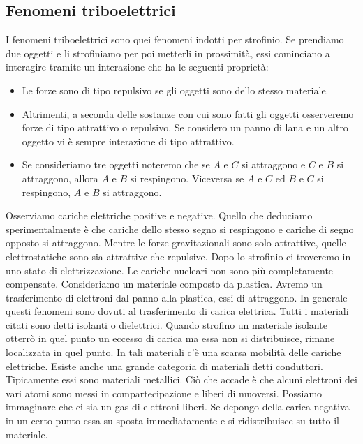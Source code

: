 \subsection{Fenomeni triboelettrici}

I fenomeni triboelettrici sono quei fenomeni indotti per strofinio. Se prendiamo due oggetti e li strofiniamo per poi metterli in prossimità, essi cominciano a interagire tramite un interazione che ha le seguenti proprietà:

\begin{itemize}
	\item Le forze sono di tipo repulsivo se gli oggetti sono dello stesso materiale.
	\item Altrimenti, a seconda delle sostanze con cui sono fatti gli oggetti osserveremo forze di tipo attrattivo o repulsivo. Se considero un panno di lana e un altro oggetto vi è sempre interazione di tipo attrattivo.
	\item Se consideriamo tre oggetti noteremo che se $A$ e $C$ si attraggono e $C$ e $B$ si attraggono, allora $A$ e $B$ si respingono. Viceversa se $A$ e $C$ ed $B$ e $C$ si respingono, $A$ e $B$ si attraggono.
\end{itemize}

Osserviamo cariche elettriche positive e negative. Quello che deduciamo sperimentalmente è che cariche dello stesso segno si respingono e cariche di segno opposto si attraggono. Mentre le forze gravitazionali sono solo attrattive, quelle elettrostatiche sono sia attrattive che repulsive.
Dopo lo strofinio ci troveremo in uno stato di elettrizzazione. Le cariche nucleari non sono più completamente compensate. Consideriamo un materiale composto da plastica. Avremo un trasferimento di elettroni dal panno alla plastica, essi di attraggono. In generale questi fenomeni sono dovuti al trasferimento di carica elettrica. Tutti i materiali citati sono detti isolanti o dielettrici. Quando strofino un materiale isolante otterrò in quel punto un eccesso di carica ma essa non si distribuisce, rimane localizzata in quel punto. In tali materiali c'è una scarsa mobilità delle cariche elettriche.
Esiste anche una grande categoria di materiali detti conduttori. Tipicamente essi sono materiali metallici. Ciò che accade è che alcuni elettroni dei vari atomi sono messi in compartecipazione e liberi di muoversi. Possiamo immaginare che ci sia un gas di elettroni liberi. Se depongo della carica negativa in un certo punto essa su sposta immediatamente e si ridistribuisce su tutto il materiale.

